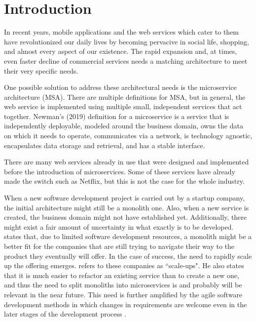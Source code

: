 


\section{Introduction}
\begin{sloppypar}
    In recent years, mobile applications and the web services which cater to
    them have revolutionized our daily lives by becoming pervacive in social life,
    shopping, and almost every aspect of our existence. The rapid expansion and,
    at times, even faster decline of commercial services needs a matching
    architecture to meet their very specific needs.
\end{sloppypar}
\begin{sloppypar} 
    One possible solution to address these architectural needs is the microservice
    architecture (MSA). There are multiple definitions for MSA, but in general,
    the web service is implemented using multiple small, independent services
    that act together. Newman's (2019) definition for a microservice is a
    service that is independently deployable, modeled around the business
    domain, owns the data on which it needs to operate, communicates via a
    network, is technology agnostic, encapsulates data storage and retrieval,
    and has a stable interface.
\end{sloppypar}
\begin{sloppypar}
    There are many web services already in use that were designed and
    implemented before the introduction of microservices. Some of these services
    have already made the switch such as Netflix, but this is not the case for
    the whole industry.
\end{sloppypar}
\begin{sloppypar}
    When a new software development project is carried out by a startup company,
    the initial architecture might still be a monolith one. Also, when a new
    service is created, the business domain might not have established yet.
    Additionally, there might exist a fair amount of uncertainty in what exactly
    is to be developed. \citet{newman2019} states that, due to limited software
    development resources, a monolith might be a better fit for the companies
    that are still trying to navigate their way to the product they eventually
    will offer. In the case of success, the need to rapidly scale up the
    offering emerges. \citet{newman2019} refers to these companies as
    ``scale-ups". He also states that it is much easier to refactor an existing
    service than to create a new one, and thus the need to split monoliths into
    microservices is and probably will be relevant in the near future. This need
    is further amplified by the agile software development methods in which
    changes in requirements are welcome even in the later stages of the
    development process \citep{agilemanifesto}.
\end{sloppypar}
